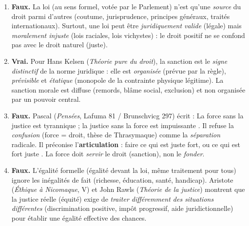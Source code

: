 \documentclass[11pt]{article}
\newcommand{\cle}[1]{{\popxbold\color{popdark}#1}}
\begin{document}
\begin{corrige}
\begin{enumerate}
    \item \textbf{Faux.} La \cle{loi} (au sens formel, votée par le Parlement) n'est qu'une \emph{source} du droit parmi d'autres (coutume, jurisprudence, principes généraux, traités internationaux). Surtout, une loi peut être \emph{juridiquement valide} (légale) mais \emph{moralement injuste} (lois raciales, lois vichystes) : le droit positif ne se confond pas avec le droit naturel (juste).
    \item \textbf{Vrai.} Pour Hans \cle{Kelsen} (\emph{Théorie pure du droit}), la \cle{sanction} est le \emph{signe distinctif} de la norme juridique : elle est \emph{organisée} (prévue par la règle), \emph{prévisible} et \emph{étatique} (monopole de la contrainte physique légitime). La sanction morale est diffuse (remords, blâme social, exclusion) et non organisée par un pouvoir central.
    \item \textbf{Faux.} Pascal (\emph{Pensées}, Lafuma 81 / Brunschvicg 297) écrit : \guillemotleft La force sans la justice est tyrannique ; la justice sans la force est impuissante \guillemotright. Il refuse la \emph{confusion} (force = droit, thèse de Thrasymaque) comme la \emph{séparation} radicale. Il préconise l'\textbf{articulation} : \guillemotleft faire ce qui est juste fort, ou ce qui est fort juste \guillemotright. La force doit \emph{servir} le droit (sanction), non le \emph{fonder}.
    \item \textbf{Faux.} L'\cle{égalité formelle} (égalité devant la loi, même traitement pour tous) ignore les inégalités de fait (richesse, éducation, santé, handicap). Aristote (\emph{Éthique à Nicomaque}, V) et John \cle{Rawls} (\emph{Théorie de la justice}) montrent que la justice réelle (\cle{équité}) exige de \emph{traiter différemment des situations différentes} (discrimination positive, impôt progressif, aide juridictionnelle) pour établir une égalité effective des chances.
\end{enumerate}
\end{corrige}
\end{document}
